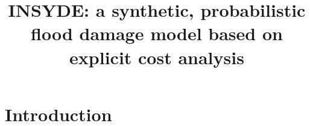 \documentclass[gc, manuscript]{copernicus}
\begin{document}
\title{INSYDE: a synthetic, probabilistic flood damage model based on explicit
cost analysis}


\Author[]{}{}












\received{}
\pubdiscuss{} %
\revised{}
\accepted{}
\published{}




\maketitle






\section{Introduction}
\end{document}
